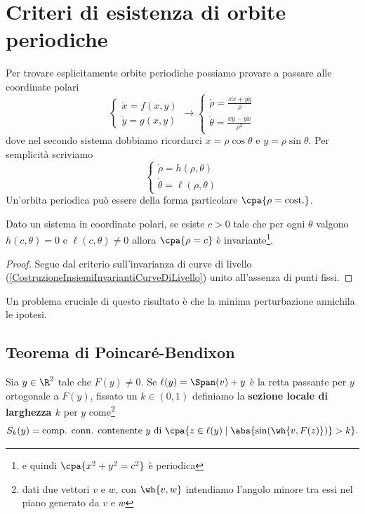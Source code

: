 \section{Criteri di esistenza di orbite periodiche}
Per trovare esplicitamente orbite periodiche possiamo provare a passare alle coordinate polari
\[\begin{cases}
\dot x=f(x,y)\\
\dot y=g(x,y)
\end{cases} \longrightarrow \begin{cases}
\displaystyle\dot \rho =\frac{x\dot x+y\dot y}{\rho}\\
\displaystyle\dot\theta=\frac{x\dot y-y\dot x}{\rho^2}
\end{cases}\]
dove nel secondo sistema dobbiamo ricordarci $x=\rho\cos\theta$ e $y=\rho\sin\theta$. Per semplicit\`a scriviamo
\[\begin{cases}
\dot \rho=h(\rho,\theta)\\
\dot \theta=\ell(\rho,\theta)
\end{cases}\]
Un'orbita periodica pu\`o essere della forma particolare $\cpa{\rho=\text{cost.}}$.
\begin{proposition}\label{CriterioPolareEsistenzaOrbitaPeriodica}
Dato un sistema in coordinate polari, se esiste $c>0$ tale che per ogni $\theta$ valgono $h(c,\theta)=0$ e $\ell(c,\theta)\neq0$ allora $\cpa{\rho=c}$ \`e invariante\footnote{e quindi $\cpa{x^2+y^2=c^2}$ \`e periodica}.
\end{proposition}
\begin{proof}
Segue dal criterio sull'invarianza di curve di livello (\ref{CostruzioneInsiemiInvariantiCurveDiLivello}) unito all'assenza di punti fissi.
\end{proof}
\noindent Un problema cruciale di questo risultato \`e che la minima perturbazione annichila le ipotesi.

\subsection{Teorema di Poincar\'e-Bendixon}

\begin{definition}
Sia $y\in \R^2$ tale che $F(y)\neq 0$. Se $\ell(y)=\Span(v)+y$ \`e la retta passante per $y$ ortogonale a $F(y)$, fissato un $k\in (0,1)$ definiamo la \textbf{sezione locale di larghezza $k$} per $y$ come\footnote{dati due vettori $v$ e $w$, con $\wh{v,w}$ intendiamo l'angolo minore tra essi nel piano generato da $v$ e $w$}
\[S_k(y)=\text{comp. conn. contenente $y$ di }\cpa{z\in \ell(y)\mid \abs{\sin(\wh{v,F(z)})}>k}.\]
\end{definition}

